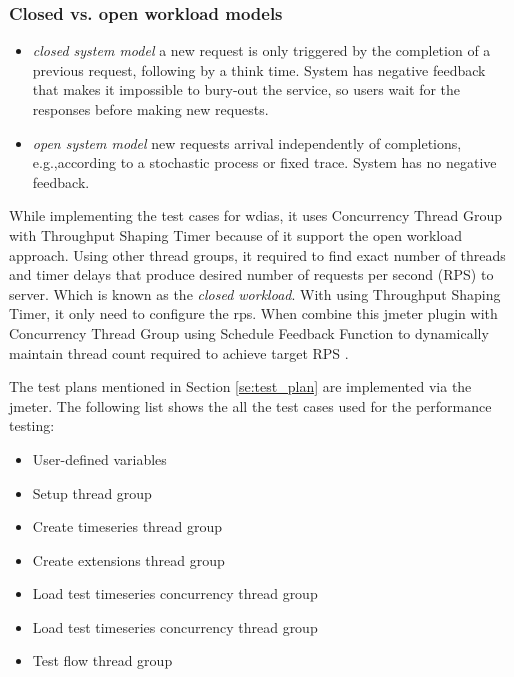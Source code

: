 \subsubsection{Closed vs. open workload models}
\label{subse:closed_vs_open_workload}
\begin{itemize}
    \item \emph{closed system model} \cite{Haggett1998AnWales} a new request is only triggered by the completion of a previous request, following by a think time. System has negative feedback that makes it impossible to bury-out the service, so users wait for the responses before making new requests.
    \item \emph{open system model} new requests arrival independently of completions, e.g.,according to a stochastic process or fixed trace. System has no negative feedback.
\end{itemize}
While implementing the test cases for \acrshort{wdias}, it uses Concurrency Thread Group with Throughput Shaping Timer because of it support the open workload approach.
Using other thread groups, it required to find exact number of threads and timer delays that produce desired number of requests per second (RPS) to server. Which is known as the \emph{closed workload}.
With using Throughput Shaping Timer, it only need to configure the \acrfull{rps}. When combine this \acrshort{jmeter} plugin with Concurrency Thread Group using Schedule Feedback Function to dynamically maintain thread count required to achieve target RPS \cite{KarunarathneGihanWdias/wdias-performance-test:JMeter.}.

The test plans mentioned in Section \ref{se:test_plan} are implemented via the \acrshort{jmeter}. The following list shows the all the test cases used for the performance testing:

\begin{itemize}
    \item User-defined variables
    \item Setup thread group
    \item Create timeseries thread group
    \item Create extensions thread group
    \item Load test timeseries concurrency thread group
    \item Load test timeseries concurrency thread group
    \item Test flow thread group
\end{itemize}

